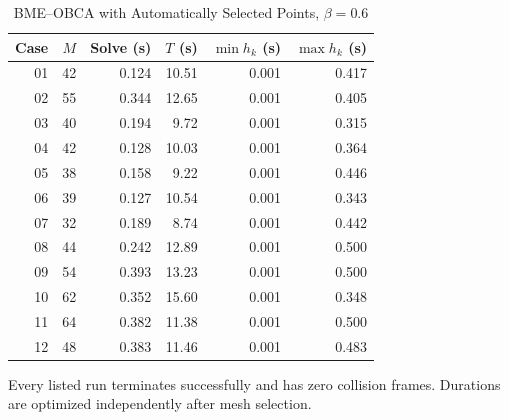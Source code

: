 \begin{table}[t]
\caption{BME--OBCA with Automatically Selected Points, $\beta=0.6$}\label{tab:cases}
\centering\footnotesize
\begin{tabular}{@{}rrrrrr@{}}\toprule
Case&$M$&Solve (s)&$T$ (s)&$\min h_k$ (s)&$\max h_k$ (s)\\\midrule
01&42&0.124&10.51&0.001&0.417\\
02&55&0.344&12.65&0.001&0.405\\
03&40&0.194&9.72&0.001&0.315\\
04&42&0.128&10.03&0.001&0.364\\
05&38&0.158&9.22&0.001&0.446\\
06&39&0.127&10.54&0.001&0.343\\
07&32&0.189&8.74&0.001&0.442\\
08&44&0.242&12.89&0.001&0.500\\
09&54&0.393&13.23&0.001&0.500\\
10&62&0.352&15.60&0.001&0.348\\
11&64&0.382&11.38&0.001&0.500\\
12&48&0.383&11.46&0.001&0.483\\
\bottomrule\end{tabular}
\par\smallskip\parbox{\columnwidth}{\footnotesize Every listed run terminates successfully and has zero collision frames. Durations are optimized independently after mesh selection.}
\end{table}